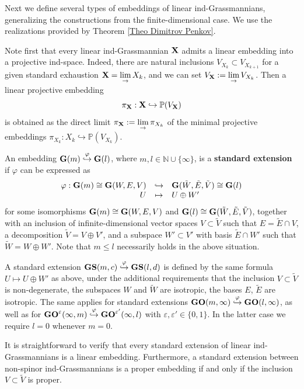 \documentclass[12pt]{amsart}
\def\NN {{\mathbb N}}     %
\def\PP {{\mathbb P}}     %
\def\eps {\varepsilon}
\def\hw  {\hookrightarrow}
\begin{document}
Next we define several types of embeddings of linear ind-Grassmannians, generalizing the constructions from the finite-dimensional case. We use the realizations provided by Theorem \ref{Theo Dimitrov Penkov}.

Note first that every linear ind-Grassmannian ${\bf X}$ admits a linear embedding into a projective ind-space. Indeed, there are natural inclusions $V_{X_k}\subset V_{X_{k+1}}$ for a given standard exhaustion ${\bf X}=\lim\limits_{\to} X_k$, and we can set $V_{\bf X}:=\lim\limits_\to V_{X_k}$. Then a linear projective embedding
$$
\pi_{\bf X}:{\bf X}\hw \PP(V_{\bf X})
$$
is obtained as the direct limit $\pi_{\bf X}:=\lim\limits_\to \pi_{X_k}$ of the minimal projective embeddings $\pi_{X_k}:X_k\hw\PP(V_{X_k})$.


An embedding ${\bf G}(m)\stackrel{\varphi}{\hookrightarrow}{\bf G}(l)$, where $m,l\in\NN\cup\{\infty\}$, is a {\bf standard extension} if $\varphi$ can be expressed as
\begin{gather}\label{For ind-standard ext ordinary}
\begin{array}{rcl}
\varphi:{\bf G}(m)\cong {\bf G}(W,E,V) & \hookrightarrow & {\bf G}(\tilde W,\tilde E,\tilde V) \cong {\bf G}(l) \\ 
U & \mapsto  & U\oplus W'
\end{array}
\end{gather}
for some isomorphisms ${\bf G}(m)\cong {\bf G}(W,E,V)$ and ${\bf G}(l)\cong {\bf G}(\tilde W,\tilde E,\tilde V)$, together with an inclusion of infinite-dimensional vector spaces $V\subset \tilde V$ such that $E=\tilde E\cap V$, a decomposition $\tilde V=V\oplus V'$, and a subspace $W'\subset V'$ with basis $\tilde E\cap W'$ such that $\tilde W=W\oplus W'$. Note that $m\leq l$ necessarily holds in the above situation.


A standard extension ${\bf GS}(m,c)\stackrel{\varphi}{\hw}{\bf GS}(l,d)$ is defined by the same formula $U \mapsto U\oplus W'$ as above, under the additional requirements that the inclusion $V\subset \tilde V$ is non-degenerate, the subspaces $W$ and $\tilde W$ are isotropic, the bases $E$, $\tilde E$ are isotropic. The same applies for standard extensions ${\bf GO}(m,\infty)\stackrel{\varphi}{\hw}{\bf GO}(l,\infty)$, as well as for ${\bf GO}^\eps(\infty,m)\stackrel{\varphi}{\hw}{\bf GO}^{\eps'}(\infty,l)$ with $\eps,\eps'\in\{0,1\}$. In the latter case we require $l=0$ whenever $m=0$.

It is straightforward to verify that every standard extension of linear ind-Grassmannians is a linear embedding. Furthermore, a standard extension between non-spinor ind-Grassmannians is a proper embedding if and only if the inclusion $V\subset \tilde V$ is proper.
\end{document}

